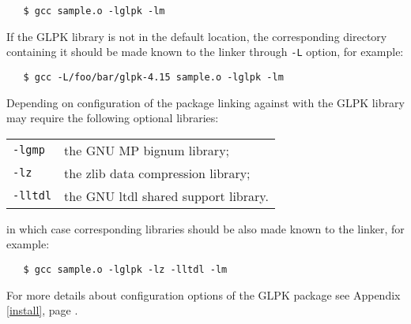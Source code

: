 \begin{verbatim}
   $ gcc sample.o -lglpk -lm
\end{verbatim}

If the GLPK library is not in the default location, the corresponding
directory containing it should be made known to the linker through
\verb|-L| option, for example:

\begin{verbatim}
   $ gcc -L/foo/bar/glpk-4.15 sample.o -lglpk -lm
\end{verbatim}

Depending on configuration of the package linking against with the GLPK
library may require the following optional libraries:

\bigskip

\begin{tabular}{@{}ll}
\verb|-lgmp|  & the GNU MP bignum library; \\
\verb|-lz|    & the zlib data compression library; \\
\verb|-lltdl| & the GNU ltdl shared support library. \\
\end{tabular}

\bigskip

\noindent
in which case corresponding libraries should be also made known to the
linker, for example:

\begin{verbatim}
   $ gcc sample.o -lglpk -lz -lltdl -lm
\end{verbatim}

For more details about configuration options of the GLPK package see
Appendix \ref{install}, page \pageref{install}.

